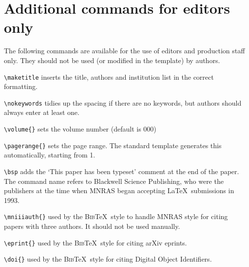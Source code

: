 \documentclass[a4paper,fleqn,usenatbib,useAMS]{mnras}
\newcommand{\bibtex}{\textsc{Bib}\!\TeX} %
\begin{document}
\section{Additional commands for editors only}
The following commands are available for the use of editors and production staff only.
They should not be used (or modified in the template) by authors.

\begin{description}
 \item \verb'\maketitle' inserts the title, authors and institution list in the correct formatting.
 \item \verb'\nokeywords' tidies up the spacing if there are no keywords, but authors should always enter at least one.
 \item \verb'\volume{}' sets the volume number (default is 000)
 \item \verb'\pagerange{}' sets the page range. The standard template generates this automatically, starting from 1.
 \item \verb'\bsp' adds the `This paper has been typeset\textellipsis' comment at the end of the paper.
The command name refers to Blackwell Science Publishing, who were the publishers at the time when MNRAS began accepting \LaTeX\ submissions in 1993.
 \item \verb'\mniiiauth{}' used by the \bibtex\ style to handle MNRAS style for citing papers with three authors. It should not be used manually.
 \item \verb'\eprint{}' used by the \bibtex\ style for citing arXiv eprints.
 \item \verb'\doi{}' used by the \bibtex\ style for citing Digital Object Identifiers.
\end{description}



\bsp	%
\label{lastpage}
\end{document}
